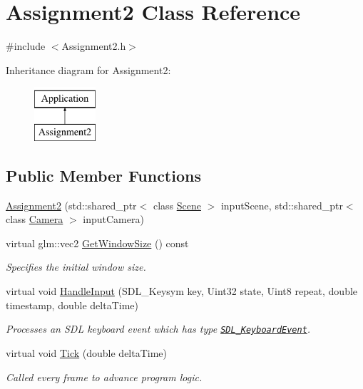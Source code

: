 \hypertarget{class_assignment2}{}\section{Assignment2 Class Reference}
\label{class_assignment2}


{\ttfamily \#include $<$Assignment2.\+h$>$}

Inheritance diagram for Assignment2\+:\begin{figure}[H]
\begin{center}
\leavevmode
\includegraphics[height=2.000000cm]{class_assignment2}
\end{center}
\end{figure}
\subsection*{Public Member Functions}
\begin{DoxyCompactItemize}
\item
\hyperlink{class_assignment2_ac684d2ecb894a4e71f8359e3a2ebd37f}{Assignment2} (std\+::shared\+\_\+ptr$<$ class \hyperlink{class_scene}{Scene} $>$ input\+Scene, std\+::shared\+\_\+ptr$<$ class \hyperlink{class_camera}{Camera} $>$ input\+Camera)
\item
virtual glm\+::vec2 \hyperlink{class_assignment2_a9ea79bd468c12dde5159ca7b8efd8e1e}{Get\+Window\+Size} () const
\begin{DoxyCompactList}\small\item\em Specifies the initial window size. \end{DoxyCompactList}\item
virtual void \hyperlink{class_assignment2_a3ee099a8ba45db14103541981e3c4fe8}{Handle\+Input} (S\+D\+L\+\_\+\+Keysym key, Uint32 state, Uint8 repeat, double timestamp, double delta\+Time)
\begin{DoxyCompactList}\small\item\em Processes an S\+DL keyboard event which has type \href{https://wiki.libsdl.org/SDL_KeyboardEvent}{\tt S\+D\+L\+\_\+\+Keyboard\+Event}. \end{DoxyCompactList}\item
virtual void \hyperlink{class_assignment2_a41544ad361dd798d5fae1ec3197fc66e}{Tick} (double delta\+Time)
\begin{DoxyCompactList}\small\item\em Called every frame to advance program logic. \end{DoxyCompactList}\end{DoxyCompactItemize}
